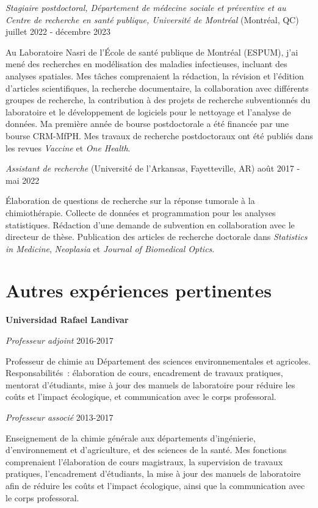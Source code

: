 \documentclass[10pt,]{article}
\providecommand{\tightlist}{%
  \setlength{\itemsep}{0pt}\setlength{\parskip}{0pt}}
\renewenvironment{itemize}{
  \begin{list}{}{
    \setlength{\leftmargin}{1.5em}
  }
}{
  \end{list}
}
\begin{document}
\emph{Stagiaire postdoctoral, Département de médecine sociale et
préventive et au Centre de recherche en santé publique, Université de
Montréal} (Montréal, QC) \hfill juillet 2022 - décembre 2023

Au Laboratoire Nasri de l'École de santé publique de Montréal (ESPUM),
j'ai mené des recherches en modélisation des maladies infectieuses,
incluant des analyses spatiales. Mes tâches comprenaient la rédaction,
la révision et l'édition d'articles scientifiques, la recherche
documentaire, la collaboration avec différents groupes de recherche, la
contribution à des projets de recherche subventionnés du laboratoire et
le développement de logiciels pour le nettoyage et l'analyse de données.
Ma première année de bourse postdoctorale a été financée par une bourse
CRM-MfPH. Mes travaux de recherche postdoctoraux ont été publiés dans
les revues \emph{Vaccine} et \emph{One Health}.

\emph{Assistant de recherche} (Université de l'Arkansas, Fayetteville,
AR) \hfill août 2017 - mai 2022

Élaboration de questions de recherche sur la réponse tumorale à la
chimiothérapie. Collecte de données et programmation pour les analyses
statistiques. Rédaction d'une demande de subvention en collaboration
avec le directeur de thèse. Publication des articles de recherche
doctorale dans \emph{Statistics in Medicine}, \emph{Neoplasia} et
\emph{Journal of Biomedical Optics}.

\section{Autres expériences
pertinentes}\label{autres-expuxe9riences-pertinentes}

\textbf{Universidad Rafael Landivar}

\emph{Professeur adjoint} \hfill 2016-2017

\begin{itemize}
\tightlist
\item
  Professeur de chimie au Département des sciences environnementales et
  agricoles. Responsabilités~: élaboration de cours, encadrement de
  travaux pratiques, mentorat d'étudiants, mise à jour des manuels de
  laboratoire pour réduire les coûts et l'impact écologique, et
  communication avec le corps professoral.
\end{itemize}

\emph{Professeur associé} \hfill 2013-2017

\begin{itemize}
\tightlist
\item
  Enseignement de la chimie générale aux départements d'ingénierie,
  d'environnement et d'agriculture, et des sciences de la santé. Mes
  fonctions comprenaient l'élaboration de cours magistraux, la
  supervision de travaux pratiques, l'encadrement d'étudiants, la mise à
  jour des manuels de laboratoire afin de réduire les coûts et l'impact
  écologique, ainsi que la communication avec le corps professoral.
\end{itemize}
\end{document}
